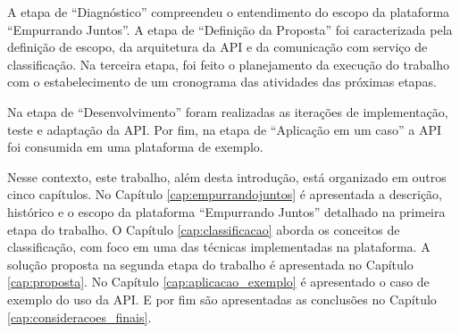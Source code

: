 A etapa de ``Diagnóstico'' compreendeu o entendimento do escopo da plataforma ``Empurrando Juntos''.
A etapa de ``Definição da Proposta'' foi caracterizada pela definição de escopo, 
da arquitetura da API e da comunicação com serviço de classificação. Na terceira etapa, 
foi feito o planejamento da execução do trabalho com o estabelecimento
de um cronograma das atividades das próximas etapas. 

Na etapa de ``Desenvolvimento'' foram realizadas as iterações de implementação, teste e adaptação da API. 
Por fim, na etapa de ``Aplicação em um caso'' a API foi consumida em uma plataforma de exemplo.

Nesse contexto, este trabalho, além desta introdução, está organizado em outros cinco capítulos.
No Capítulo \ref{cap:empurrandojuntos} é apresentada a descrição, histórico e o escopo da plataforma ``Empurrando Juntos'' 
detalhado na primeira etapa do trabalho.
O Capítulo \ref{cap:classificacao} aborda os conceitos de classificação, com foco em uma das técnicas implementadas na plataforma. 
A solução proposta na segunda etapa do trabalho é apresentada no Capítulo \ref{cap:proposta}. No Capítulo \ref{cap:aplicacao_exemplo} é
apresentado o caso de exemplo do uso da API. E por fim são apresentadas as conclusões no Capítulo \ref{cap:consideracoes_finais}.
